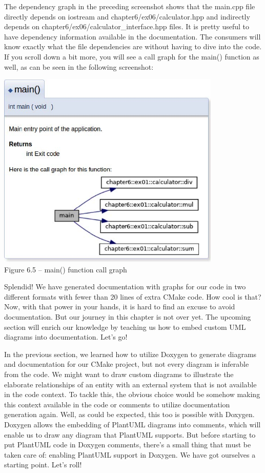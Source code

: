 The dependency graph in the preceding screenshot shows that the main.cpp file directly depends on iostream and chapter6/ex06/calculator.hpp and indirectly depends on chapter6/ex06/calculator\_interface.hpp files. It is pretty useful to have dependency information available in the documentation. The consumers will know exactly what the file dependencies are without having to dive into the code. If you scroll down a bit more, you will see a call graph for the main() function as well, as can be seen in the following screenshot:

\begin{center}
\includegraphics[width=0.8\textwidth]{content/2/chapter6/images/5.jpg}\\
Figure 6.5 – main() function call graph
\end{center}

Splendid! We have generated documentation with graphs for our code in two different formats with fewer than 20 lines of extra CMake code. How cool is that? Now, with that power in your hands, it is hard to find an excuse to avoid documentation. But our journey in this chapter is not over yet. The upcoming section will enrich our knowledge by teaching us how to embed custom UML diagrams into documentation. Let's go!
 

In the previous section, we learned how to utilize Doxygen to generate diagrams and documentation for our CMake project, but not every diagram is inferable from the code. We might want to draw custom diagrams to illustrate the elaborate relationships of an entity with an external system that is not available in the code context. To tackle this, the obvious choice would be somehow making this context available in the code or comments to utilize documentation generation again. Well, as could be expected, this too is possible with Doxygen. Doxygen allows the embedding of PlantUML diagrams into comments, which will enable us to draw any diagram that PlantUML supports. But before starting to put PlantUML code in Doxygen comments, there's a small thing that must be taken care of: enabling PlantUML support in Doxygen. We have got ourselves a starting point. Let's roll!

